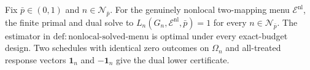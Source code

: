 Fix \(\bar p\in(0,1)\) and \(n\in\mathcal N_{\bar p}\). For the genuinely nonlocal two-mapping menu \(\mathcal E^{\mathrm{nl}}\), the finite primal and dual solve to \(L_n(G_n,\mathcal E^{\mathrm{nl}},\bar p)=1\) for every \(n\in\mathcal N_{\bar p}\). The estimator in \(\mathrm{def{:}nonlocal\text{-}solved\text{-}menu}\) is optimal under every exact-budget design. Two schedules with identical zero outcomes on \(\Omega_n\) and all-treated response vectors \(\mathbf 1_n\) and \(-\mathbf 1_n\) give the dual lower certificate.